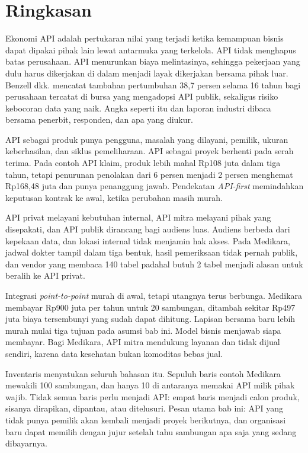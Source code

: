 \section{Ringkasan}

Ekonomi API adalah pertukaran nilai yang terjadi ketika kemampuan bisnis dapat dipakai pihak lain lewat antarmuka
yang terkelola. API tidak menghapus batas perusahaan. API menurunkan biaya melintasinya, sehingga pekerjaan yang dulu
harus dikerjakan di dalam menjadi layak dikerjakan bersama pihak luar. Benzell dkk. mencatat tambahan pertumbuhan 38,7
persen selama 16 tahun bagi perusahaan tercatat di bursa yang mengadopsi API publik, sekaligus risiko kebocoran data
yang naik. Angka seperti itu dan laporan industri dibaca bersama penerbit, responden, dan apa yang diukur.

API sebagai produk punya pengguna, masalah yang dilayani, pemilik, ukuran keberhasilan, dan siklus pemeliharaan. API
sebagai proyek berhenti pada serah terima. Pada contoh API klaim, produk lebih mahal Rp108 juta dalam tiga tahun, tetapi
penurunan penolakan dari 6 persen menjadi 2 persen menghemat Rp168,48 juta dan punya penanggung jawab. Pendekatan
\textit{API-first} memindahkan keputusan kontrak ke awal, ketika perubahan masih murah.

API privat melayani kebutuhan internal, API mitra melayani pihak yang disepakati, dan API publik dirancang bagi audiens
luas. Audiens berbeda dari kepekaan data, dan lokasi internal tidak menjamin hak akses. Pada Medikara, jadwal dokter
tampil dalam tiga bentuk, hasil pemeriksaan tidak pernah publik, dan vendor yang membaca 140 tabel padahal butuh 2 tabel
menjadi alasan untuk beralih ke API privat.

Integrasi \textit{point-to-point} murah di awal, tetapi utangnya terus berbunga. Medikara membayar Rp900 juta per tahun
untuk 20 sambungan, ditambah sekitar Rp497 juta biaya tersembunyi yang sudah dapat dihitung. Lapisan bersama baru lebih
murah mulai tiga tujuan pada asumsi bab ini. Model bisnis menjawab siapa membayar. Bagi Medikara, API mitra mendukung
layanan dan tidak dijual sendiri, karena data kesehatan bukan komoditas bebas jual.

Inventaris menyatukan seluruh bahasan itu. Sepuluh baris contoh Medikara mewakili 100 sambungan, dan hanya 10 di antaranya
memakai API milik pihak wajib. Tidak semua baris perlu menjadi API: empat baris menjadi calon produk, sisanya dirapikan,
dipantau, atau ditelusuri. Pesan utama bab ini: API yang tidak punya pemilik akan kembali menjadi proyek berikutnya, dan
organisasi baru dapat memilih dengan jujur setelah tahu sambungan apa saja yang sedang dibayarnya.

